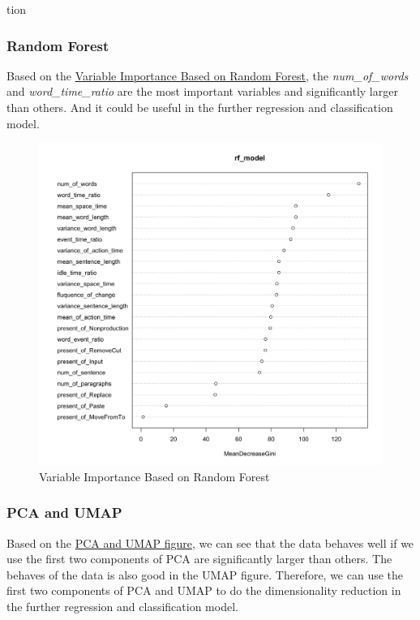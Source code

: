 tion\documentclass[8pt]{article}
\begin{document}
\subsubsection{Random Forest}
Based on the \hyperref[fig:RF_important]{Variable Importance Based on Random Forest}, the \textit{num\_of\_words} and \textit{word\_time\_ratio} are the most important variables and significantly larger than others. 
And it could be useful in the further regression and classification model. 
\begin{figure}[H]
    \centering
    \label{fig:RF_important}
    \includegraphics*[scale=0.1]{figures/Variable_improtance_RF.png}
    \caption{Variable Importance Based on Random Forest}
\end{figure}

\subsubsection{PCA and UMAP}
Based on the \hyperref[fig:PCA_and_UMAP]{PCA and UMAP figure}, we can see that the data behaves well if we use the first two components of PCA are significantly larger than others. The behaves of the data is also good in the UMAP figure. Therefore, we can use the first two components of PCA and UMAP to do the dimensionality reduction in the further regression and classification model.
\end{document}
